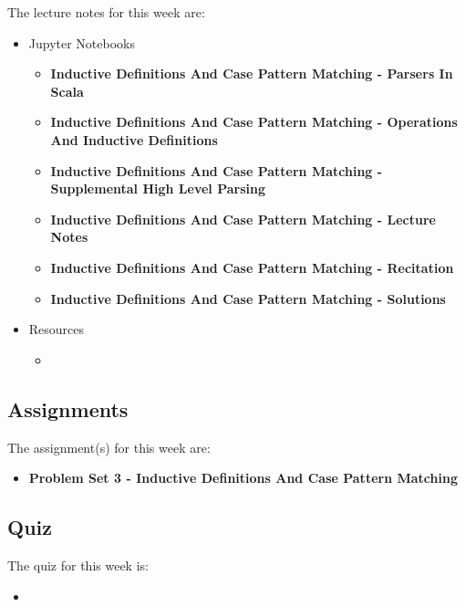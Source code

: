 \noindent The lecture notes for this week are:

\begin{itemize}
    \item Jupyter Notebooks
    \begin{itemize}
        \item \textbf{Inductive Definitions And Case Pattern Matching - Parsers In Scala}
        \item \textbf{Inductive Definitions And Case Pattern Matching - Operations And Inductive Definitions}
        \item \textbf{Inductive Definitions And Case Pattern Matching - Supplemental High Level Parsing}
        \item \textbf{Inductive Definitions And Case Pattern Matching - Lecture Notes}
        \item \textbf{Inductive Definitions And Case Pattern Matching - Recitation}
        \item \textbf{Inductive Definitions And Case Pattern Matching - Solutions}
    \end{itemize}
    \item Resources
    \begin{itemize}
        \item {}
    \end{itemize}
\end{itemize}

\subsection{Assignments}

The assignment(s) for this week are:

\begin{itemize}
    \item \textbf{Problem Set 3 - Inductive Definitions And Case Pattern Matching}
\end{itemize}

\subsection{Quiz}

The quiz for this week is:

\begin{itemize}
    \item {}
\end{itemize}


